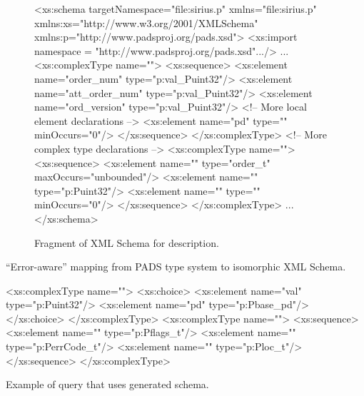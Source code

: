 \begin{figure*}
\begin{small}
\begin{code}
<xs:schema targetNamespace="file:sirius.p"
           xmlns="file:sirius.p"
           xmlns:xs="http://www.w3.org/2001/XMLSchema"
           xmlns:p="http://www.padsproj.org/pads.xsd">
<xs:import namespace = "http://www.padsproj.org/pads.xsd".../>
...
<xs:complexType name="">
 <xs:sequence>
  <xs:element name="order_num" type="p:val_Puint32"/>
  <xs:element name="att_order_num" type="p:val_Puint32"/>
  <xs:element name="ord_version" type="p:val_Puint32"/>
  <!-- More local element declarations -->
  <xs:element name="pd" type="" minOccurs="0"/>
 </xs:sequence>
</xs:complexType>
<!-- More complex type declarations -->
<xs:complexType name="">
 <xs:sequence>
  <xs:element name="" type="order_t" maxOccurs="unbounded"/>
  <xs:element name="" type="p:Puint32"/>
  <xs:element name="" type="" minOccurs="0"/>
 </xs:sequence>
</xs:complexType>
...
</xs:schema>
\end{code}
\end{small}
\caption{Fragment of XML Schema for \dibbler{} \pads{} description.}
\label{figure:dibbler-schema}
\end{figure*}

``Error-aware'' mapping from PADS type system to isomorphic XML
Schema. 
\begin{small}
\begin{code}
<xs:complexType name="">
  <xs:choice>
   <xs:element name="val" type="p:Puint32"/>
   <xs:element name="pd" type="p:Pbase_pd"/>
  </xs:choice>
</xs:complexType>
<xs:complexType name="">
 <xs:sequence>
   <xs:element name=""  type="p:Pflags_t"/>
   <xs:element name="" type="p:PerrCode_t"/>
   <xs:element name=""     type="p:Ploc_t"/>
 </xs:sequence>
</xs:complexType>
\end{code}
\end{small}

Example of query that uses generated schema.
\begin{small}
\end{small}

